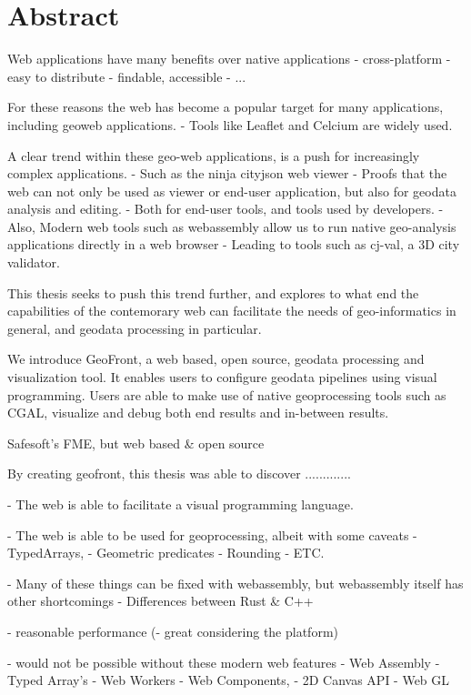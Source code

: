 
\chapter*{Abstract}



Web applications have many benefits over native applications
  - cross-platform
  - easy to distribute
  - findable, accessible
  - ...

For these reasons the web has become a popular target for many applications, including geoweb applications. 
- Tools like Leaflet and Celcium are widely used.

A clear trend within these geo-web applications, is a push for increasingly complex applications. 
  - Such as the ninja cityjson web viewer
    - Proofs that the web can not only be used as viewer or end-user application, 
      but also for geodata analysis and editing.
    - Both for end-user tools, and tools used by developers.
  - Also, Modern web tools such as webassembly allow us to run native geo-analysis applications directly in a web browser
    - Leading to tools such as cj-val, a 3D city validator.

This thesis seeks to push this trend further, 
and explores to what end the capabilities of the contemorary web can facilitate the needs of geo-informatics in general, 
and geodata processing in particular. 

We introduce GeoFront, a web based, open source, geodata processing and visualization tool. 
It enables users to configure geodata pipelines using visual programming. 
Users are able to make use of native geoprocessing tools such as CGAL, visualize and debug both end results and in-between results.

Safesoft's FME, but web based \& open source 

By creating geofront, this thesis was able to discover .............

- The web is able to facilitate a visual programming language.

- The web is able to be used for geoprocessing, albeit with some caveats
  - TypedArrays,
  - Geometric predicates 
  - Rounding
  - ETC.

- Many of these things can be fixed with webassembly, but webassembly itself has other shortcomings
  - Differences between Rust \& C++

- reasonable performance 
  (- great considering the platform)

- would not be possible without these modern web features
  - Web Assembly 
  - Typed Array's 
  - Web Workers
  - Web Components,
  - 2D Canvas API
  - Web GL

